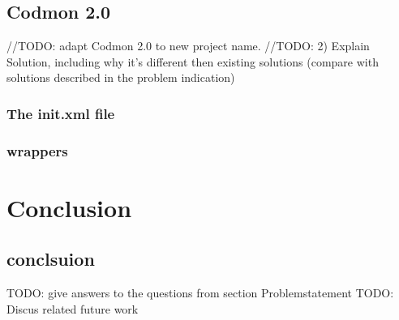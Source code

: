 \documentclass[a4paper,10pt]{scrartcl}
\begin{document}
\subsection{Codmon 2.0}
//TODO: adapt Codmon 2.0 to new project name.
//TODO: 2) Explain Solution, including why it's different then existing solutions (compare with solutions described in the problem indication)

\subsubsection{The init.xml file}
\label{subsec:init}

\subsubsection{wrappers}
\label{subsec:wrappers}

\newpage
\section{Conclusion}
\subsection{conclsuion}
TODO: give answers to the questions from section Problemstatement
TODO: Discus related future work
\newpage


\end{document}
